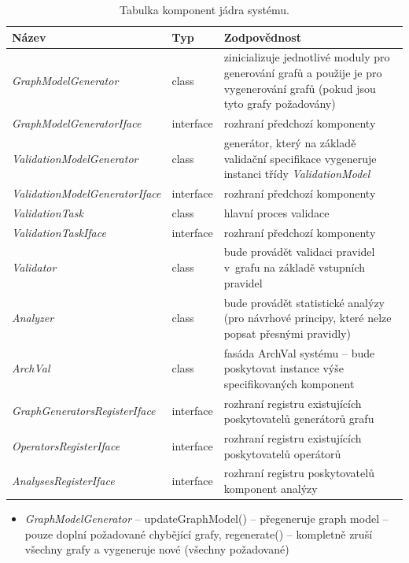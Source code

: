 \begin{table}
  \caption{Tabulka komponent jádra systému. \label{design-archval_core_components}}
  \begin{center}
    \begin{tabular}{ | l | l | p{7.5cm} | }
      \hline
      \textbf{Název} & \textbf{Typ} & \textbf{Zodpovědnost} \\
      \hline
      \hline
      \emph{GraphModelGenerator} & class & zinicializuje jednotlivé moduly pro generování grafů a použije je pro vygenerování grafů (pokud jsou tyto grafy požadovány) \\ \hline
      \emph{GraphModelGeneratorIface} & interface & rozhraní předchozí komponenty \\ \hline
      \emph{ValidationModelGenerator} & class & generátor, který na základě validační specifikace vygeneruje instanci třídy \mbox{\emph{ValidationModel}} \\ \hline
      \emph{ValidationModelGeneratorIface} & interface & rozhraní předchozí komponenty \\ \hline
      \emph{ValidationTask} & class & hlavní proces validace \\ \hline
      \emph{ValidationTaskIface} & interface & rozhraní předchozí komponenty \\ \hline
      \emph{Validator} & class & bude provádět validaci pravidel v~grafu na základě vstupních pravidel \\ \hline
      \emph{Analyzer} & class & bude provádět statistické analýzy (pro návrhové principy, které nelze popsat přesnými pravidly) \\ \hline
      \emph{ArchVal} & class & fasáda ArchVal systému -- bude poskytovat instance výše specifikovaných komponent \\ \hline
      \hline
      \emph{GraphGeneratorsRegisterIface} & interface & rozhraní registru existujících poskytovatelů generátorů grafu \\ \hline
      \emph{OperatorsRegisterIface} & interface & rozhraní registru existujících poskytovatelů operátorů \\ \hline
      \emph{AnalysesRegisterIface} & interface & rozhraní registru poskytovatelů komponent analýzy \\ \hline
    \end{tabular}
  \end{center}

\end{table}

\begin{itemize}
\item \emph{GraphModelGenerator} -- updateGraphModel() -- přegeneruje graph model -- pouze doplní požadované chybějící grafy, regenerate() -- kompletně zruší všechny grafy a vygeneruje nové (všechny požadované)
\end{itemize}


